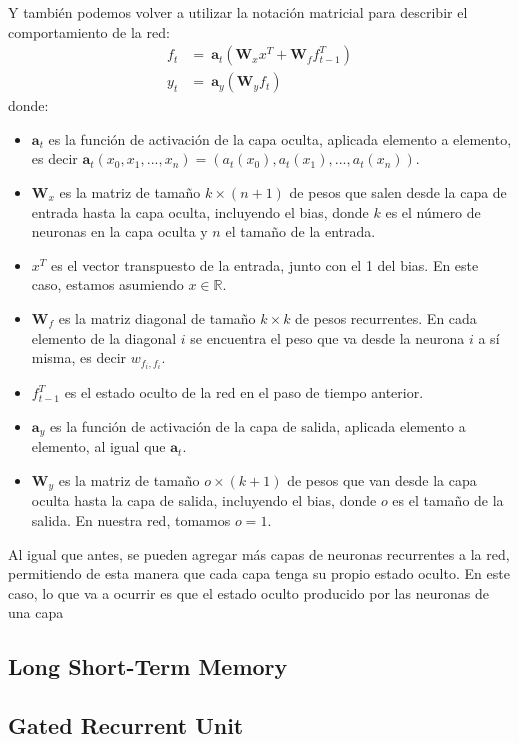 \documentclass[../../main.tex]{subfiles}
\begin{document}
Y también podemos volver a utilizar la notación matricial para describir el comportamiento
de la red:
\begin{align*}
    f_t &=\ \bm{a}_t \left( \mathbf{W}_x x^T + \mathbf{W}_f f_{t-1}^T \right) \\
    y_t &=\ \bm{a}_y \left( \mathbf{W}_y f_t \right)
\end{align*}
donde:
\begin{itemize}[itemsep=0.05cm]
    \item \(\bm{a}_t\) es la función de activación de la capa oculta, aplicada elemento a
    elemento, es decir \(\bm{a}_t(x_0, x_1, ..., x_n) = (a_t(x_0), a_t(x_1), ...,
    a_t(x_n))\).
    \item \(\mathbf{W}_x\) es la matriz de tamaño \(k \times (n+1)\) de pesos que salen
    desde la capa de entrada hasta la capa oculta, incluyendo el bias, donde \(k\) es el
    número de neuronas en la capa oculta y \(n\) el tamaño de la entrada.
    \item \(x^T\) es el vector transpuesto de la entrada, junto con el 1 del bias.
    En este caso, estamos asumiendo \(x \in \mathbb{R}\).
    \item \(\mathbf{W}_f\) es la matriz diagonal de tamaño \(k \times k\) de pesos
    recurrentes. En cada elemento de la diagonal \(i\) se encuentra el peso que va desde
    la neurona \(i\) a sí misma, es decir \(w_{f_i, f_i}\).
    \item \(f_{t-1}^T\) es el estado oculto de la red en el paso de tiempo anterior.
    \item \(\bm{a}_y\) es la función de activación de la capa de salida, aplicada elemento a
    elemento, al igual que \(\bm{a}_t\).
    \item \(\mathbf{W}_y\) es la matriz de tamaño \(o \times (k+1)\) de pesos que van
    desde la capa oculta hasta la capa de salida, incluyendo el bias, donde \(o\) es el
    tamaño de la salida. En nuestra red, tomamos \(o=1\).
\end{itemize}

Al igual que antes, se pueden agregar más capas de neuronas recurrentes a la red,
permitiendo de esta manera que cada capa tenga su propio estado oculto. En este caso,
lo que va a ocurrir es que el estado oculto producido por las neuronas de una capa



\subsection{Long Short-Term Memory}

\subsection{Gated Recurrent Unit}
\end{document}
